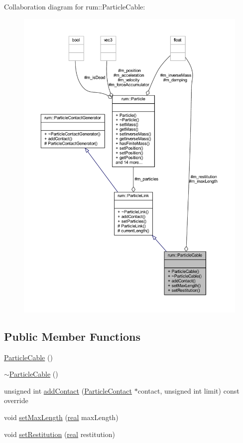 Collaboration diagram for rum\+:\+:Particle\+Cable\+:\nopagebreak
\begin{figure}[H]
\begin{center}
\leavevmode
\includegraphics[width=350pt]{classrum_1_1_particle_cable__coll__graph}
\end{center}
\end{figure}
\subsection*{Public Member Functions}
\begin{DoxyCompactItemize}
\item 
\mbox{\hyperlink{classrum_1_1_particle_cable_ad2b529c1d51b6af9f3c2e7f535e64c0c}{Particle\+Cable}} ()
\item 
\mbox{\hyperlink{classrum_1_1_particle_cable_aac2552bf3ddefc5c59fd7953a719b43a}{$\sim$\+Particle\+Cable}} ()
\item 
unsigned int \mbox{\hyperlink{classrum_1_1_particle_cable_a078344be0db7ccc00d326ac767736431}{add\+Contact}} (\mbox{\hyperlink{classrum_1_1_particle_contact}{Particle\+Contact}} $\ast$contact, unsigned int limit) const override
\item 
void \mbox{\hyperlink{classrum_1_1_particle_cable_a3a40cd1d2581bec38d66275af22c9347}{set\+Max\+Length}} (\mbox{\hyperlink{namespacerum_a7e8cca23573d5eaead0f138cbaa4862c}{real}} max\+Length)
\item 
void \mbox{\hyperlink{classrum_1_1_particle_cable_ab6b2076bdb4bd5ab15a695a17649ae56}{set\+Restitution}} (\mbox{\hyperlink{namespacerum_a7e8cca23573d5eaead0f138cbaa4862c}{real}} restitution)
\end{DoxyCompactItemize}
